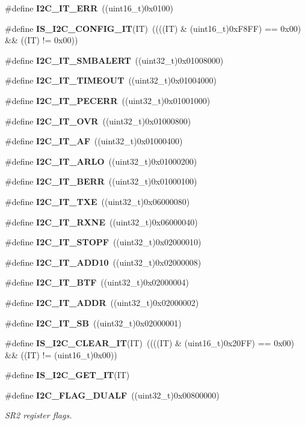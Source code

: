 \begin{DoxyCompactItemize}
\item 
\#define \textbf{ I2\+C\+\_\+\+I\+T\+\_\+\+E\+RR}~((uint16\+\_\+t)0x0100)
\item 
\#define \textbf{ I\+S\+\_\+\+I2\+C\+\_\+\+C\+O\+N\+F\+I\+G\+\_\+\+IT}(IT)~((((IT) \& (uint16\+\_\+t)0x\+F8\+F\+F) == 0x00) \&\& ((\+I\+T) != 0x00))
\item 
\#define \textbf{ I2\+C\+\_\+\+I\+T\+\_\+\+S\+M\+B\+A\+L\+E\+RT}~((uint32\+\_\+t)0x01008000)
\item 
\#define \textbf{ I2\+C\+\_\+\+I\+T\+\_\+\+T\+I\+M\+E\+O\+UT}~((uint32\+\_\+t)0x01004000)
\item 
\#define \textbf{ I2\+C\+\_\+\+I\+T\+\_\+\+P\+E\+C\+E\+RR}~((uint32\+\_\+t)0x01001000)
\item 
\#define \textbf{ I2\+C\+\_\+\+I\+T\+\_\+\+O\+VR}~((uint32\+\_\+t)0x01000800)
\item 
\#define \textbf{ I2\+C\+\_\+\+I\+T\+\_\+\+AF}~((uint32\+\_\+t)0x01000400)
\item 
\#define \textbf{ I2\+C\+\_\+\+I\+T\+\_\+\+A\+R\+LO}~((uint32\+\_\+t)0x01000200)
\item 
\#define \textbf{ I2\+C\+\_\+\+I\+T\+\_\+\+B\+E\+RR}~((uint32\+\_\+t)0x01000100)
\item 
\#define \textbf{ I2\+C\+\_\+\+I\+T\+\_\+\+T\+XE}~((uint32\+\_\+t)0x06000080)
\item 
\#define \textbf{ I2\+C\+\_\+\+I\+T\+\_\+\+R\+X\+NE}~((uint32\+\_\+t)0x06000040)
\item 
\#define \textbf{ I2\+C\+\_\+\+I\+T\+\_\+\+S\+T\+O\+PF}~((uint32\+\_\+t)0x02000010)
\item 
\#define \textbf{ I2\+C\+\_\+\+I\+T\+\_\+\+A\+D\+D10}~((uint32\+\_\+t)0x02000008)
\item 
\#define \textbf{ I2\+C\+\_\+\+I\+T\+\_\+\+B\+TF}~((uint32\+\_\+t)0x02000004)
\item 
\#define \textbf{ I2\+C\+\_\+\+I\+T\+\_\+\+A\+D\+DR}~((uint32\+\_\+t)0x02000002)
\item 
\#define \textbf{ I2\+C\+\_\+\+I\+T\+\_\+\+SB}~((uint32\+\_\+t)0x02000001)
\item 
\#define \textbf{ I\+S\+\_\+\+I2\+C\+\_\+\+C\+L\+E\+A\+R\+\_\+\+IT}(IT)~((((IT) \& (uint16\+\_\+t)0x20\+F\+F) == 0x00) \&\& ((\+I\+T) != (uint16\+\_\+t)0x00))
\item 
\#define \textbf{ I\+S\+\_\+\+I2\+C\+\_\+\+G\+E\+T\+\_\+\+IT}(IT)
\item 
\#define \textbf{ I2\+C\+\_\+\+F\+L\+A\+G\+\_\+\+D\+U\+A\+LF}~((uint32\+\_\+t)0x00800000)
\begin{DoxyCompactList}\small\item\em S\+R2 register flags. \end{DoxyCompactList}\item 

\end{DoxyCompactItemize}
